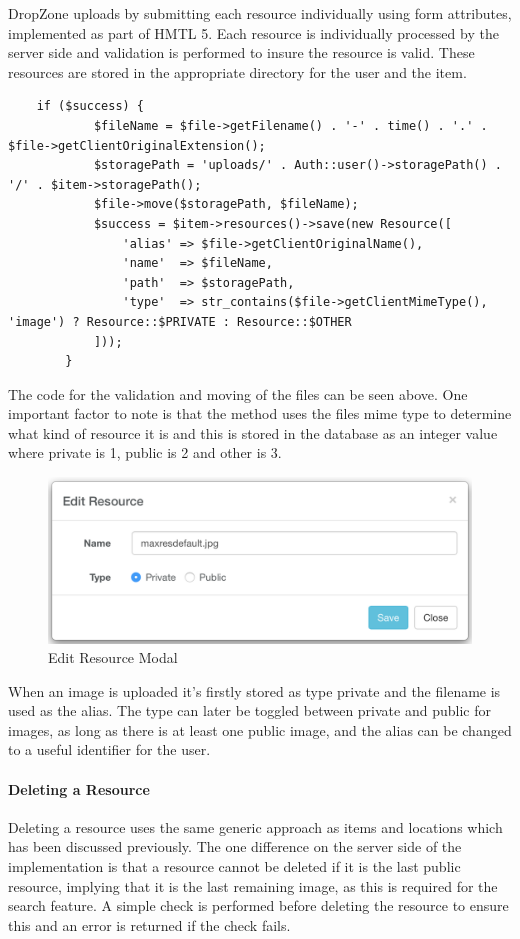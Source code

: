 DropZone uploads by submitting each resource individually using form attributes, implemented as part of HMTL 5. Each resource is individually processed by the server side and validation is performed to insure the resource is valid. These resources are stored in the appropriate directory for the user and the item.

\begin{lstlisting}
	if ($success) {
            $fileName = $file->getFilename() . '-' . time() . '.' . $file->getClientOriginalExtension();
            $storagePath = 'uploads/' . Auth::user()->storagePath() . '/' . $item->storagePath();
            $file->move($storagePath, $fileName);
            $success = $item->resources()->save(new Resource([
                'alias' => $file->getClientOriginalName(),
                'name'  => $fileName,
                'path'  => $storagePath,
                'type'  => str_contains($file->getClientMimeType(), 'image') ? Resource::$PRIVATE : Resource::$OTHER
            ]));
        }
\end{lstlisting}

The code for the validation and moving of the files can be seen above. One important factor to note is that the method uses the files mime type to determine what kind of resource it is and this is stored in the database as an integer value where private is 1, public is 2 and other is 3. 

\begin{figure}[H]
	\centering
	\includegraphics[width=1.0\textwidth]{images/Frisk/Edit_Resource}
	\caption{Edit Resource Modal} \label{fig:Edit_Resource}
\end{figure}

When an image is uploaded it's firstly stored as type private and the filename is used as the alias. The type can later be toggled between private and public for images, as long as there is at least one public image, and the alias can be changed to a useful identifier for the user.

\paragraph{Deleting a Resource}
Deleting a resource uses the same generic approach as items and locations which has been discussed previously. The one difference on the server side of the implementation is that a resource cannot be deleted if it is the last public resource, implying that it is the last remaining image, as this is required for the search feature. A simple check is performed before deleting the resource to ensure this and an error is returned if the check fails.

